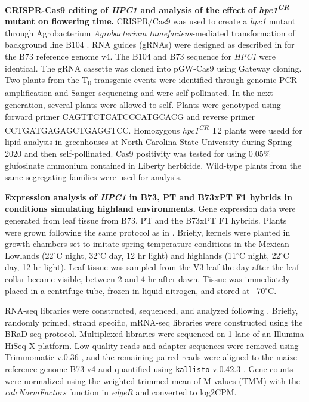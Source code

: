 \documentclass[9pt,twocolumn,twoside,lineno]{biorxiv}
\begin{document}
\textbf{CRISPR-Cas9 editing of \textit{HPC1} and analysis of the effect of \textit{hpc1\textsuperscript{CR}} mutant on flowering time.}
CRISPR/Cas9 was used to create a \textit{hpc1} mutant through Agrobacterium \textit{Agrobacterium tumefaciens}-mediated transformation of background line B104 \cite{Wu2020-nq, Char2017-uk}. 
RNA guides (gRNAs) were designed as described in \cite{Brazelton2015-co} for the B73 reference genome v4. 
The B104 and B73 sequence for \textit{HPC1} were identical. 
The gRNA cassette was cloned into pGW-Cas9 using Gateway cloning. 
Two plants from the T\textsubscript{0} transgenic events were identified through genomic PCR amplification and Sanger sequencing and were self-pollinated. 
In the next generation, several plants were allowed to self.
Plants were genotyped using forward primer CAGTTCTCATCCCATGCACG and reverse primer CCTGATGAGAGCTGAGGTCC.
Homozygous \textit{hpc1\textsuperscript{CR}} T2 plants were  usedd for lipid analysis in greenhouses at  North Carolina State University during Spring 2020 and then self-pollinated. 
Cas9 positivity was tested for using 0.05\% glufosinate ammonium contained in Liberty herbicide. 
Wild-type plants from the same segregating families were used for analysis.

\textbf{Expression analysis of \textit{HPC1} in B73, PT and B73xPT F1 hybrids in conditions simulating highland environments.}
Gene expression data were generated from leaf tissue from B73, PT and the B73xPT F1 hybrids. 
Plants were grown following the same protocol as in \cite{Crow2020-gene}.
Briefly, kernels were planted in growth chambers set to imitate spring temperature conditions in the Mexican Lowlands (22$^{\circ}$C night, 32$^{\circ}$C day, 12 hr light) and highlands (11$^{\circ}$C night, 22$^{\circ}$C day, 12 hr light). 
Leaf tissue was sampled from the V3 leaf the day after the leaf collar became visible, between 2 and 4 hr after dawn. 
Tissue was immediately placed in a centrifuge tube, frozen in liquid nitrogen, and stored at --70$^{\circ}$C.

RNA-seq libraries were constructed, sequenced, and analyzed following \cite{Crow2020-gene}. 
Briefly, randomly primed, strand specific, mRNA-seq libraries were constructed using the BRaD-seq \cite{townsley2015brad} protocol.
Multiplexed libraries were sequenced on 1 lane of an Illumina HiSeq X platform. 
Low quality reads and adapter sequences were removed using Trimmomatic v.0.36 \cite{bolger2014trimmomatic}, and the remaining paired reads were aligned to the maize reference genome B73 v4 and quantified using \texttt{kallisto} v.0.42.3 \cite{bray2016near}. 
Gene counts were normalized using the weighted trimmed mean of M-values (TMM) with the \textit{calcNormFactors} function in \textit{edgeR} \cite{robinson2010edger} and converted to log2CPM.
\end{document}
